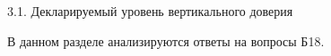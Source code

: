 \begin{frame}{3.1. Декларируемый уровень вертикального доверия  }

\tiny

В данном разделе анализируются ответы на вопросы Б18.

\end{frame}


